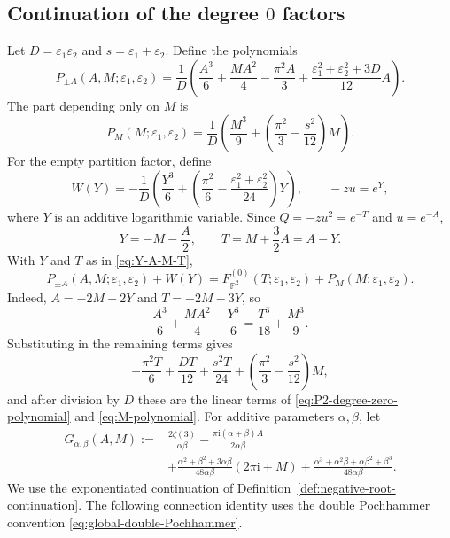 \documentclass{amsart}
\theoremstyle{definition}
\numberwithin{equation}{section}
\newcommand{\eps}{\varepsilon}
\begin{document}
\subsection{Continuation of the degree \(0\) factors}
Let \(D=\eps_1\eps_2\) and \(s=\eps_1+\eps_2\).  Define the polynomials
\begin{equation}
 P_{\pm A}(A,M;\eps_1,\eps_2)
 =\frac1D\left(
 \frac{A^3}{6}+\frac{MA^2}{4}-\frac{\pi^2A}{3}
 +\frac{\eps_1^2+\eps_2^2+3D}{12}A\right).
\label{eq:root-polynomial}
\end{equation}
The part depending only on \(M\) is
\begin{equation}
 P_M(M;\eps_1,\eps_2)
 =\frac1D\left(
 \frac{M^3}{9}
 +\left(\frac{\pi^2}{3}-\frac{s^2}{12}\right)M\right).
\label{eq:M-polynomial}
\end{equation}
For the empty partition factor, define
\begin{equation}
 W(Y)=-\frac1D\left(
 \frac{Y^3}{6}+
 \left(\frac{\pi^2}{6}-\frac{\eps_1^2+\eps_2^2}{24}\right)Y\right),
 \qquad -zu=e^Y,
\label{eq:empty-two-leg-polynomial}
\end{equation}
where \(Y\) is an additive logarithmic variable.  Since \(Q=-zu^2=e^{-T}\) and \(u=e^{-A}\),
\begin{equation}
 Y=-M-\frac A2,\qquad T=M+\frac32A=A-Y.
\label{eq:Y-A-M-T}
\end{equation}
With \(Y\) and \(T\) as in \eqref{eq:Y-A-M-T},
\begin{equation}
 P_{\pm A}(A,M;\eps_1,\eps_2)+W(Y)
 =F_{\mathbb P^2}^{(0)}(T;\eps_1,\eps_2)
  +P_M(M;\eps_1,\eps_2).
\label{eq:polynomial-decomposition}
\end{equation}
Indeed, \(A=-2M-2Y\) and \(T=-2M-3Y\), so
\[
 \frac{A^3}{6}+\frac{MA^2}{4}-\frac{Y^3}{6}
 =\frac{T^3}{18}+\frac{M^3}{9}.
\]
Substituting in the remaining terms gives
\[
 -\frac{\pi^2T}{6}+\frac{DT}{12}
 +\frac{s^2T}{24}
 +\left(\frac{\pi^2}{3}-\frac{s^2}{12}\right)M,
\]
and after division by \(D\) these are the linear terms of \eqref{eq:P2-degree-zero-polynomial} and \eqref{eq:M-polynomial}.  For additive parameters \(\alpha,\beta\), let
\begin{equation}
\begin{aligned}
 G_{\alpha,\beta}(A,M)
 :={}&\frac{2\zeta(3)}{\alpha\beta}
 -\frac{\pi\mathrm{i}(\alpha+\beta)A}{2\alpha\beta}\\
 &+\frac{\alpha^2+\beta^2+3\alpha\beta}
 {48\alpha\beta}(2\pi\mathrm{i}+M)
 +\frac{\alpha^3+\alpha^2\beta+\alpha\beta^2+\beta^3}
 {48\alpha\beta}.
\end{aligned}
\label{eq:gamma-normalization}
\end{equation}
We use the exponentiated continuation of Definition~\ref{def:negative-root-continuation}.  The following connection identity uses the double Pochhammer convention \eqref{eq:global-double-Pochhammer}.
\end{document}

